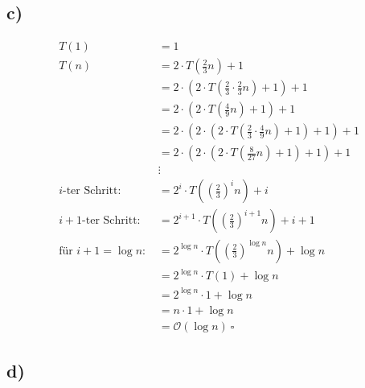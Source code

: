 \documentclass[a4paper]{scrartcl}
\begin{document}
\subsection*{c)}
\begin{align*}
T(1) & = 1 \\
T(n) & = 2 \cdot T\left(\frac{2}{3}n\right) + 1 \\
& = 2 \cdot (2 \cdot T\left(\frac{2}{3} \cdot \frac{2}{3}n\right) + 1) + 1 \\
& = 2 \cdot (2 \cdot T\left(\frac{4}{9}n\right) + 1) + 1 \\
& = 2 \cdot (2 \cdot (2 \cdot T \left(\frac{2}{3} \cdot \frac{4}{9}n\right) + 1) + 1) + 1 \\
& = 2 \cdot (2 \cdot (2 \cdot T \left(\frac{8}{27}n\right) + 1) + 1) + 1 \\
& \vdots \\
i \text{-ter Schritt: } & = 2^i \cdot T\left(\left(\frac{2}{3}\right)^i n\right) + i \\
i+1 \text{-ter Schritt: } & = 2^{i+1} \cdot T\left(\left(\frac{2}{3}\right)^{i+1} n\right) + {i+1} \\
\text{für } i+1 = \log n \text{: } & = 2^{\log n} \cdot T\left(\left(\frac{2}{3}\right)^{\log n} n\right) + {\log n} \\
& = 2^{\log n} \cdot T\left(1\right) + {\log n} \\
& = 2^{\log n} \cdot 1 + {\log n} \\
& = n \cdot 1 + {\log n} \\
& = \mathcal{O}({\log n}) ~ \square
\end{align*}

\subsection*{d)}
\end{document}
